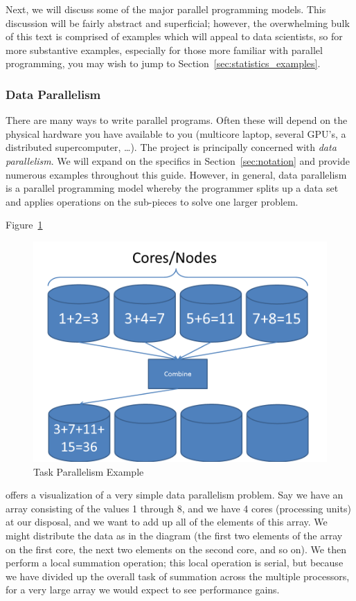 Next, we will discuss some of the major parallel programming models. This
discussion will be fairly abstract and superficial; however, the overwhelming
bulk of this text is comprised of examples which will appeal to data
scientists, so for more substantive examples, especially for those more
familiar with parallel programming, you may wish to jump to
Section~\ref{sec:statistics_examples}.



\subsubsection{Data Parallelism}

There are many ways to write parallel programs. Often these will depend on
the physical hardware you have available to you (multicore laptop, several
GPU's, a distributed supercomputer, \dots). The  project is
principally concerned with \emph{data parallelism}. We will expand on the
specifics in Section~\ref{sec:notation} and provide numerous examples
throughout this guide. However, in general, data parallelism is a parallel
programming model whereby the programmer splits up a data set and applies
operations on the sub-pieces to solve one larger problem.

Figure~\ref{fig:dataparallel} 
\begin{figure}[h]
 \centering
 \includegraphics[scale=.45]{pbdDEMO-include/pics/parallelism_data}
 \caption{Task Parallelism Example}
 \label{fig:dataparallel}
\end{figure}
offers a visualization of a very simple data parallelism problem. Say we
have an array consisting of the values 1 through 8, and we have 4 cores
(processing units) at our disposal, and we want to add up all of the elements
of this array. We might distribute the data as in the diagram (the first
two elements of the array on the first core, the next two elements on the
second core, and so on). We then perform a local summation operation;
this local operation is serial, but because we have divided up the overall
task of summation across the multiple processors, for a very large array
we would expect to see performance gains.

